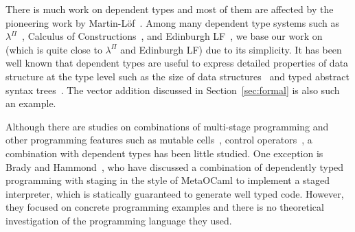 





There is much work on dependent types and most of them are affected by
the pioneering work by Martin-L\"{o}f~\cite{martin1973intuitionistic}.
Among many dependent type systems such as
$\lambda^\Pi$~\cite{Meyer1986}, Calculus of
Constructions~\cite{coquand:inria-00076024}, and Edinburgh
LF~\cite{harper1993framework}, we base our work on \LLF~\cite{attapl}
(which is quite close to $\lambda^\Pi$ and Edinburgh LF) due to its
simplicity.  It has been well known that dependent types are useful to
express detailed properties of data structure at the type level such
as the size of data structures~\cite{Xi98} and typed abstract syntax
trees~\cite{DBLP:conf/dsl/LeijenM99,DBLP:conf/popl/XiCC03}.  The
vector addition discussed in Section~\ref{sec:formal} is also such an
example.




Although there are studies on combinations of multi-stage programming and other programming features such as mutable cells~\cite{kiselyov2016refined},
control operators~\cite{KameyamaKiselyovShan09PEPM,oishi2017staging},
a combination with dependent types has been little studied.
One exception is Brady and Hammond~\cite{brady2006dependently},
who have discussed a
combination of dependently typed programming with staging in the
style of MetaOCaml to implement a staged interpreter, which is
statically guaranteed to generate well typed code.  However, they
focused on concrete programming examples and there is no theoretical investigation
of the programming language they used.


